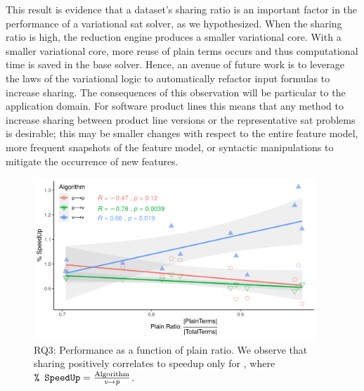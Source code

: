 This result is evidence that a dataset's sharing ratio is an important factor in
the performance of a variational \ac{sat} solver, as we hypothesized. When the
sharing ratio is high, the reduction engine produces a smaller variational core.
With a smaller variational core, more reuse of plain terms occurs and thus
computational time is saved in the base solver. Hence, an avenue of future work
is to leverage the laws of the variational logic to automatically refactor input
formulas to increase sharing. The consequences of this observation will be
particular to the application domain. For software product lines this means that
any method to increase sharing between product line versions or the
representative \ac{sat} problems is desirable; this may be smaller changes with
respect to the entire feature model, more frequent snapshots of the feature
model, or syntactic manipulations to mitigate the occurrence of new features.

\begin{figure}
  \includegraphics[width=0.95\textwidth]{Plots/RQ3}
  \caption{RQ3: Performance as a function of plain ratio. We observe that
    sharing positively correlates to speedup only for \vTov{}, where $\texttt{\%
      SpeedUp} = \frac{{\text{Algorithm}}}{{\text{$\textit{v}{\rightarrow}\textit{p}${}}}}$.}%
  \label{res:speedup}
\end{figure}

